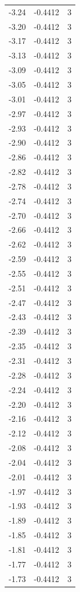 \begin{longtable}{lrr}
  -3.24 & -0.4412 & 3 \\
  -3.20 & -0.4412 & 3 \\
  -3.17 & -0.4412 & 3 \\
  -3.13 & -0.4412 & 3 \\
  -3.09 & -0.4412 & 3 \\
  -3.05 & -0.4412 & 3 \\
  -3.01 & -0.4412 & 3 \\
  -2.97 & -0.4412 & 3 \\
  -2.93 & -0.4412 & 3 \\
  -2.90 & -0.4412 & 3 \\
  -2.86 & -0.4412 & 3 \\
  -2.82 & -0.4412 & 3 \\
  -2.78 & -0.4412 & 3 \\
  -2.74 & -0.4412 & 3 \\
  -2.70 & -0.4412 & 3 \\
  -2.66 & -0.4412 & 3 \\
  -2.62 & -0.4412 & 3 \\
  -2.59 & -0.4412 & 3 \\
  -2.55 & -0.4412 & 3 \\
  -2.51 & -0.4412 & 3 \\
  -2.47 & -0.4412 & 3 \\
  -2.43 & -0.4412 & 3 \\
  -2.39 & -0.4412 & 3 \\
  -2.35 & -0.4412 & 3 \\
  -2.31 & -0.4412 & 3 \\
  -2.28 & -0.4412 & 3 \\
  -2.24 & -0.4412 & 3 \\
  -2.20 & -0.4412 & 3 \\
  -2.16 & -0.4412 & 3 \\
  -2.12 & -0.4412 & 3 \\
  -2.08 & -0.4412 & 3 \\
  -2.04 & -0.4412 & 3 \\
  -2.01 & -0.4412 & 3 \\
  -1.97 & -0.4412 & 3 \\
  -1.93 & -0.4412 & 3 \\
  -1.89 & -0.4412 & 3 \\
  -1.85 & -0.4412 & 3 \\
  -1.81 & -0.4412 & 3 \\
  -1.77 & -0.4412 & 3 \\
  -1.73 & -0.4412 & 3 \\

\end{longtable}
